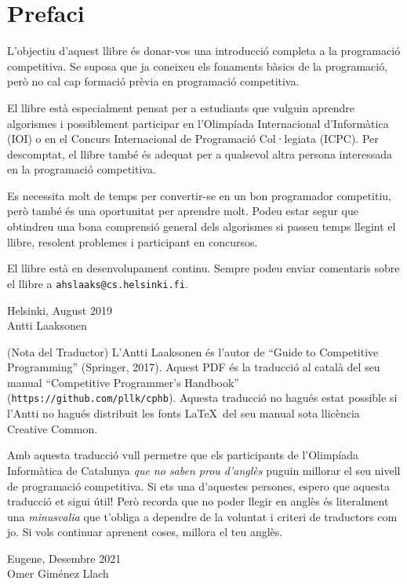 \chapter*{Prefaci}
L'objectiu d'aquest llibre és donar-vos una introducció completa a la
programació competitiva. Se suposa que ja coneixeu els fonaments
bàsics de la programació, però no cal cap formació prèvia en
programació competitiva.

El llibre està especialment pensat per a estudiants que vulguin
aprendre algorismes i possiblement participar en l'Olimpíada
Internacional d'Informàtica (IOI) o en el Concurs Internacional de
Programació Col·legiata (ICPC). Per descomptat, el llibre també és
adequat per a qualsevol altra persona interessada en la programació
competitiva.

Es necessita molt de temps per convertir-se en un bon programador
competitiu, però també és una oportunitat per aprendre molt. Podeu
estar segur que obtindreu una bona comprensió general dels algorismes
si passeu temps llegint el llibre, resolent problemes i participant en
concursos.

El llibre està en desenvolupament continu. Sempre podeu enviar
comentaris sobre el llibre a \texttt{ahslaaks@cs.helsinki.fi}.

\begin{flushright}
Helsinki, August 2019 \\
Antti Laaksonen
\end{flushright}

\bigskip
\bigskip

(Nota del Traductor) L'Antti Laaksonen és l'autor de ``Guide to
Competitive Programming'' (Springer, 2017). Aquest PDF és la traducció
al català del seu manual ``Competitive Programmer's Handbook''
(\texttt{https://github.com/pllk/cphb}). Aquesta traducció no hagués
estat possible si l'Antti no hagués distribuit les fonts \LaTeX\ del
seu manual sota llicència Creative Common.

Amb aquesta traducció vull permetre que els participants de
l'Olimpíada Informàtica de Catalunya \emph{que no saben prou d'anglès}
puguin millorar el seu nivell de programació competitiva. Si ets una
d'aquestes persones, espero que aquesta traducció et sigui útil! Però
recorda que no poder llegir en anglès és literalment una
\emph{minusvalia} que t'obliga a dependre de la voluntat i criteri de
traductors com jo. Si vols continuar aprenent coses, millora el teu
anglès.

\begin{flushright}
Eugene, Desembre 2021 \\
Omer Giménez Llach
\end{flushright}

